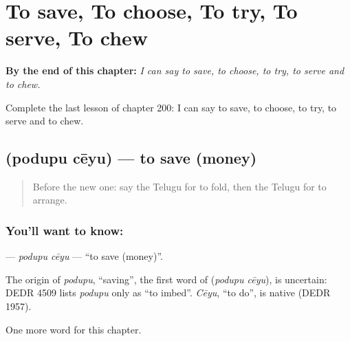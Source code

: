 
\chapter{To save, To choose, To try, To serve, To chew}
\label{ch:te-to-save-to-choose-to-try-to-serve-to-chew}

\begin{chapteropening}
\textbf{By the end of this chapter:} \emph{I can say to save, to choose, to try, to serve and to chew.}

Complete the last lesson of chapter 200: I can say to save, to choose, to try, to serve and to chew.
\end{chapteropening}

\section[\texorpdfstring{\te{పొదుపు} \te{చేయు} (podupu cēyu)}{పొదుపు చేయు (podupu cēyu)}]{  (podupu cēyu) — to save (money)}

\label{lesson:TE-C200-podupu-ceyu}



\begin{quote}
Before the new one: say the Telugu for to fold, then the Telugu for to arrange.
\end{quote}

\subsection*{You'll want to know:  }
\textbf{ } — \emph{podupu cēyu} — \textquotedblleft{}to save (money)\textquotedblright{}.

\begin{cousinweb}
The origin of \emph{podupu}, \textquotedblleft{}saving\textquotedblright{}, the first word of \textbf{ } (\emph{podupu cēyu}), is uncertain: DEDR 4509 lists \emph{podupu} only as \textquotedblleft{}to imbed\textquotedblright{}. \emph{Cēyu}, \textquotedblleft{}to do\textquotedblright{}, is native (DEDR 1957).
\end{cousinweb}

\begin{grammarlens}[title={What you've built}]
One more word for this chapter.
\end{grammarlens}


